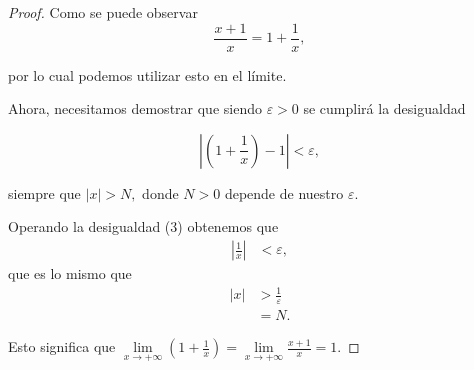 \begin{proof}
Como se puede observar
\[
	\dfrac{x+1}{x}=1+\dfrac{1}{x},
\]

por lo cual podemos utilizar esto en el l\'imite.

Ahora, necesitamos demostrar que siendo \(\varepsilon>0\) se cumplir\'a la desigualdad

\begin{equation}
	\left|\left(1+\dfrac{1}{x}\right)-1\right|<\varepsilon,
\end{equation}

siempre que \(\left|x\right|>N,\) donde \(N>0\) depende de nuestro \(\varepsilon\). 

Operando la desigualdad (3) obtenemos que
\begin{align*}
	\left|\frac{1}{x}\right|&<\varepsilon,
\end{align*}
que es lo mismo que
\begin{equation}
\begin{aligned}
	\left|x\right|&>\frac{1}{\varepsilon}\\
			&=N.
\end{aligned}
\end{equation}

Esto significa que \(\displaystyle\lim\limits_{x\to+\infty}\left(1+\frac{1}{x}\right)=\displaystyle\lim\limits_{x\to+\infty}\frac{x+1}{x}=1.\)
\end{proof}

